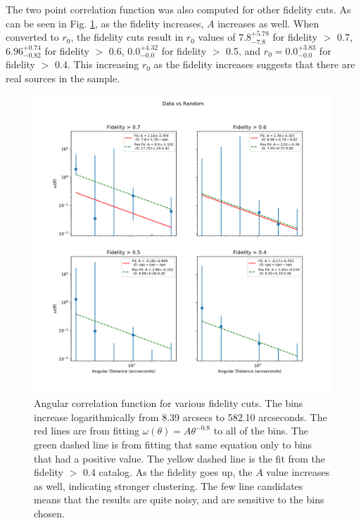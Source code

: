 
The two point correlation function was also computed for other fidelity cuts. As can be seen in Fig. \ref{fig:Angular_correlation}, as the fidelity increases, $A$ increases as well. When converted to $r_0$, the fidelity cuts result in $r_0$ values of $7.8_{-7.8}^{+5.78}$ for fidelity $>$ 0.7, $6.96_{-0.82}^{+0.74}$ for fidelity $>$ 0.6, $0.0_{-0.0}^{+4.32}$ for fidelity $>$ 0.5, and $r_0 = 0.0_{-0.0}^{+3.83}$ for fidelity $>$ 0.4. This increasing $r_0$ as the fidelity increases suggests that there are real sources in the sample.

\begin{figure}[!htbp]
\centering \includegraphics[width=160mm]{clustering_two/Log_4Panel_Data_Vs_Random_bin6_NFalse_Num20000.png}
\caption{Angular correlation function for various fidelity cuts. The bins increase logarithmically from 8.39 arcsecs to 582.10 arcseconds. The red lines are from fitting $\omega(\theta) = A\theta^{-0.8} $ to all of the bins. The green dashed line is from fitting that same equation only to bins that had a positive value. The yellow dashed line is the fit from the fidelity $>$ 0.4 catalog. As the fidelity goes up, the $A$ value increases as well, indicating stronger clustering. The few line candidates means that the results are quite noisy, and are sensitive to the bins chosen.}
\label{fig:Angular_correlation}
\end{figure}

